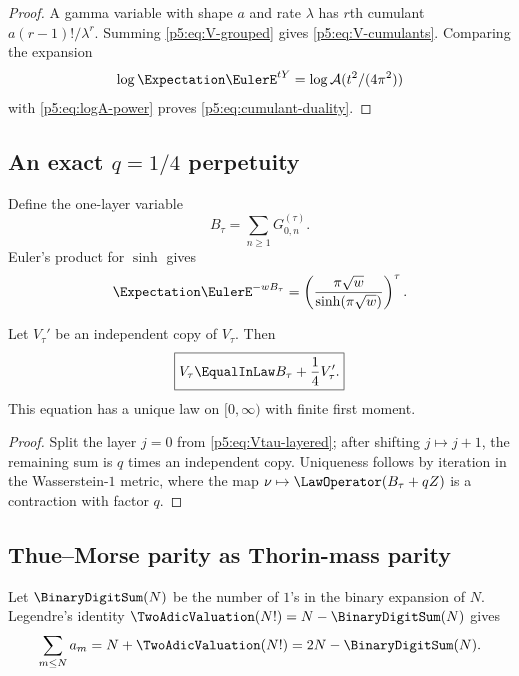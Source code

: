 \documentclass[11pt]{article}
\numberwithin{equation}{section}
\theoremstyle{definition}
\theoremstyle{remark}
\begin{document}
\begin{proof}
A gamma variable with shape $a$ and rate $\lambda$ has $r$th cumulant
$a(r-1)!/\lambda^r$.  Summing \cref{p5:eq:V-grouped} gives
\cref{p5:eq:V-cumulants}.  Comparing the expansion
\[
 \log\Expectation\EulerE^{tY}=\log\mathcal A(t^2/(4\pi^2))
\]
with \cref{p5:eq:logA-power} proves \cref{p5:eq:cumulant-duality}.
\end{proof}

\subsection{An exact $q=1/4$ perpetuity}

Define the one-layer variable
\begin{equation}\label{p5:eq:Btau}
 B_\tau=\sum_{n\ge1}G_{0,n}^{(\tau)}.
\end{equation}
Euler's product for $\sinh$ gives
\begin{equation}\label{p5:eq:B-LT}
 \Expectation\EulerE^{-wB_\tau}
 =\left(\frac{\pi\sqrt w}{\sinh(\pi\sqrt w)}\right)^\tau.
\end{equation}

\begin{corollary}\label{p5:cor:perpetuity}
Let $V_\tau'$ be an independent copy of $V_\tau$.  Then
\begin{equation}\label{p5:eq:perpetuity}
 \boxed{V_\tau\EqualInLaw B_\tau+\frac14V_\tau'.}
\end{equation}
This equation has a unique law on $[0,\infty)$ with finite first moment.
\end{corollary}

\begin{proof}
Split the layer $j=0$ from \cref{p5:eq:Vtau-layered}; after shifting
$j\mapsto j+1$, the remaining sum is $q$ times an independent copy.  Uniqueness
follows by iteration in the Wasserstein-$1$ metric, where the map
$\nu\mapsto\LawOperator(B_\tau+qZ)$ is a contraction with factor $q$.
\end{proof}

\subsection{Thue--Morse parity as Thorin-mass parity}

Let $\BinaryDigitSum(N)$ be the number of $1$'s in the binary expansion of $N$.
Legendre's identity $\TwoAdicValuation(N!)=N-\BinaryDigitSum(N)$ gives
\begin{equation}\label{p5:eq:cumulative-a}
 \sum_{m\le N}a_m=N+\TwoAdicValuation(N!)=2N-\BinaryDigitSum(N).
\end{equation}
\end{document}

